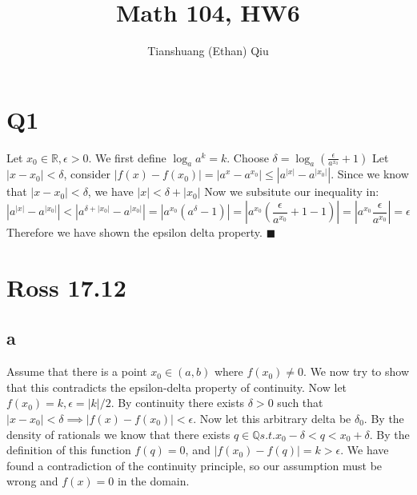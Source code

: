 \documentclass[12pt]{article}
\author{Tianshuang (Ethan) Qiu}
\newcommand{\R}{\mathbb{R}}
\newcommand{\Q}{\mathbb{Q}}
\begin{document}
\title{Math 104, HW6}
\maketitle
\newpage


\section{Q1}
Let $x_0 \in \R, \epsilon > 0$. We first define $\log_a a^k = k$. Choose $\delta = \log_a(\frac{\epsilon}{a^{x_0}}+1)$
\newline
Let $|x-x_0|<\delta$, consider $|f(x)-f(x_0)|=|a^x-a^{x_0}| \leq |a^{|x|}-a^{|x_0|}|$. Since we know that $|x-x_0|<\delta$, we have $|x|<\delta + |x_0|$
\newline
Now we subsitute our inequality in:
$$|a^{|x|}-a^{|x_0|}| < |a^{\delta + |x_0|}-a^{|x_0|}| = |a^{x_0}(a^\delta - 1)| = |a^{x_0}( \frac{\epsilon}{a^{x_0}}+1-1)| = |a^{x_0}\frac{\epsilon}{a^{x_0}}|=\epsilon$$
Therefore we have shown the epsilon delta property. $\blacksquare$
\newpage


\section{Ross 17.12}

\subsection{a}
Assume that there is a point $x_0 \in (a,b)$ where $f(x_0) \not= 0$. We now try to show that this contradicts the epsilon-delta property of continuity.
\newline
Now let $f(x_0) = k, \epsilon = |k|/2$. By continuity there exists $\delta > 0$ such that $|x-x_0|<\delta \implies |f(x)-f(x_0)|<\epsilon$. Now let this arbitrary delta be $\delta_0$. By the density of rationals we know that there exists $q \in \Q s.t. x_0-\delta < q < x_0+\delta$. By the definition of this function $f(q)=0$, and $|f(x_0)-f(q)|=k > \epsilon$. \lightning
\newline
We have found a contradiction of the continuity principle, so our assumption must be wrong and $f(x) = 0$ in the domain.
\end{document}
